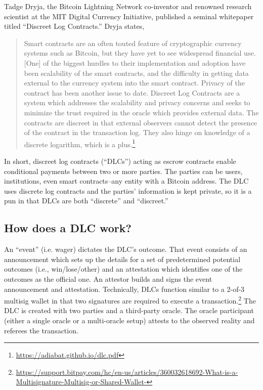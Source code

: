 \documentclass[twoside, a4paper, 11pt]{article}
\begin{document}
  Tadge Dryja, the Bitcoin Lightning Network co-inventor and renowned research scientist at the MIT Digital Currency Initiative, published a seminal whitepaper titled “Discreet Log Contracts.” Dryja states,
  \begin{quote}
    Smart contracts are an often touted feature of cryptographic currency
    systems such as Bitcoin, but they have yet to see widespread financial use.
    [One] of the biggest hurdles to their implementation and adoption have been
    scalability of the smart contracts, and the difficulty in getting data external
    to the currency system into the smart contract. Privacy of the contract has
    been another issue to date. Discreet Log Contracts are a system which
    addresses the scalability and privacy concerns and seeks to minimize the
    trust required in the oracle which provides external data. The contracts are
    discreet in that external observers cannot detect the presence of the contract
    in the transaction log. They also hinge on knowledge of a discrete logarithm,
    which is a plus.\footnote{\url{https://adiabat.github.io/dlc.pdf}}
  \end{quote}

  In short, discreet log contracts (“DLCs”) acting as escrow contracts enable conditional payments between two or more parties. The parties can be users, institutions, even smart contracts–any entity with a Bitcoin address. The DLC uses discrete log contracts and the parties’ information is kept private, so it is a pun in that DLCs are both “discrete” and “discreet.”

  \subsection{How does a DLC work?}

  An “event” (i.e. wager) dictates the DLC’s outcome. That event consists of an announcement which sets up the details for a set of predetermined potential outcomes (i.e., win/lose/other) and an attestation which identifies one of the outcomes as the official one. An attestor builds and signs the event announcement and attestation. Technically, DLCs function similar to a 2-of-3 multisig wallet in that two signatures are required to execute a transaction.\footnote{\url{https://support.bitpay.com/hc/en-us/articles/360032618692-What-is-a-Multisignature-Multisig-or-Shared-Wallet-}} The DLC is created with two parties and a third-party oracle. The oracle participant (either a single oracle or a multi-oracle setup) attests to the observed reality and referees the transaction.
\end{document}
